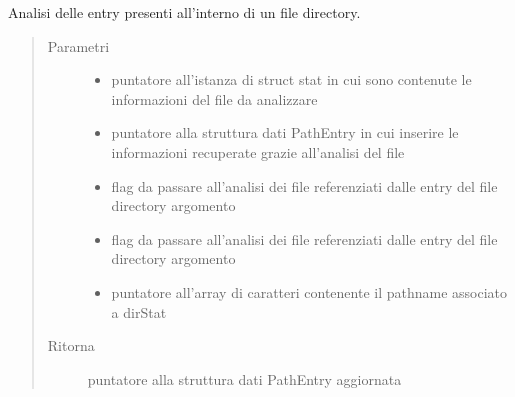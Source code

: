 \documentclass[letterpaper,10pt,italian,openany,oneside]{sphinxmanual}
\begin{document}
\begin{fulllineitems}
\label{\detokenize{documentazione:c.directoryAnalisis}}
Analisi delle entry presenti all’interno di un file directory.
\begin{quote}\begin{description}
\item[{Parametri}] \leavevmode\begin{itemize}
\item {} 
 \textendash{} puntatore all’istanza di struct stat in cui sono contenute le informazioni del file da analizzare

\item {} 
 \textendash{} puntatore alla struttura dati PathEntry in cui inserire le informazioni recuperate grazie all’analisi del file

\item {} 
 \textendash{} flag da passare all’analisi dei file referenziati dalle entry del file directory argomento

\item {} 
 \textendash{} flag da passare all’analisi dei file referenziati dalle entry del file directory argomento

\item {} 
 \textendash{} puntatore all’array di caratteri contenente il pathname associato a dirStat

\end{itemize}

\item[{Ritorna}] \leavevmode
puntatore alla struttura dati PathEntry aggiornata

\end{description}\end{quote}

\end{fulllineitems}

\end{document}
